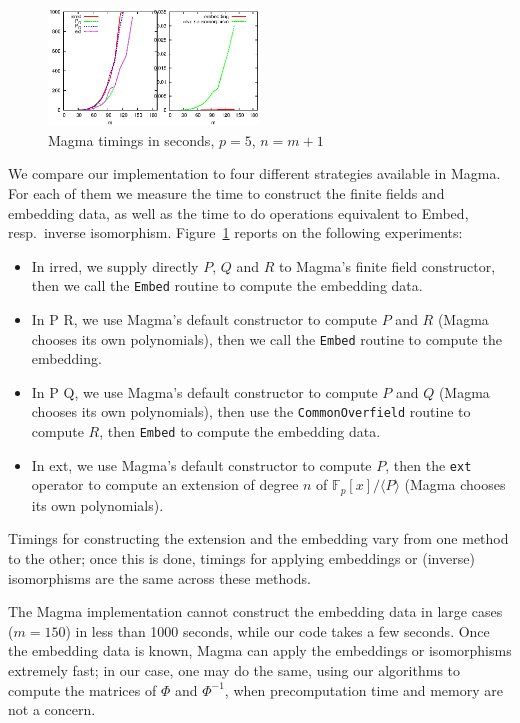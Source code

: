 \documentclass{sig-alternate}
\def\F {\ensuremath{\mathbb{F}}}
\newcounter{algo}
\newcommand{\ang}[1]{\langle#1\rangle}
\begin{document}
\begin{figure}
  \centering
  \includegraphics[width=0.5\textwidth]{magma}
  \caption{Magma timings in seconds, $p=5$, $n=m+1$}
  \label{fig:magma}
\vspace{-4ex}
\end{figure}

We compare our implementation to four different strategies available
in Magma. For each of them we measure the time to construct the finite
fields and embedding data, as well as the time to do operations
equivalent to {\sf Embed}, resp.\ inverse
isomorphism. Figure~\ref{fig:magma} reports on the following
experiments:
\begin{itemize}
\item In {\sf irred}, we supply directly $P$, $Q$ and $R$ to Magma's
  finite field constructor, then we call the \verb+Embed+ routine to
  compute the embedding data.
\item In  {\sf P R}, we use Magma's default constructor to compute $P$
  and $R$ (Magma chooses its own polynomials), then we call the
  \verb+Embed+ routine to compute the embedding.
\item In {\sf P Q}, we use Magma's default constructor to compute $P$
  and $Q$ (Magma chooses its own polynomials), then use the
  \verb+CommonOverfield+ routine to compute $R$, then \verb+Embed+ to
  compute the embedding data.
\item In {\sf ext}, we use Magma's default constructor to compute $P$,
  then the \verb+ext+ operator to compute an extension of degree $n$
  of $\F_p[x]/\ang{P}$ (Magma chooses its own polynomials).
\end{itemize}
Timings for constructing the extension and the embedding vary from one
method to the other; once this is done, timings for applying
embeddings or (inverse) isomorphisms are the same across these
methods.

The Magma implementation cannot construct the embedding data in large
cases ($m = 150$) in less than 1000 seconds, while our code takes a
few seconds. Once the embedding data is known, Magma can apply the
embeddings or isomorphisms extremely fast; in our case, one may do the
same, using our algorithms to compute the matrices of $\Phi$ and
$\Phi^{-1}$, when precomputation time and memory are not a concern.



\scriptsize
 
\end{document}
